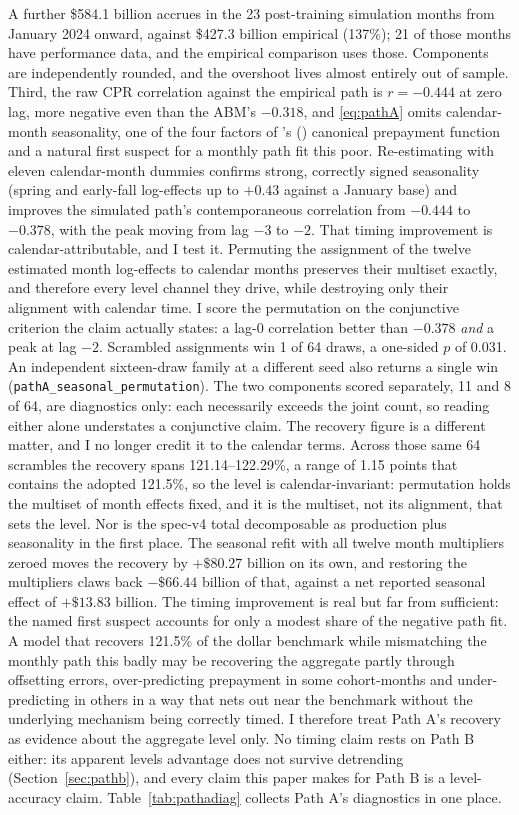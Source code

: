 \documentclass[12pt]{article}
\newcommand{\citepos}[1]{\citeauthor{#1}'s (\citeyear{#1})}
\begin{document}
A further \$584.1 billion accrues in the 23 post-training simulation months from January 2024 onward, against \$427.3 billion empirical (137\%); 21 of those months have performance data, and the empirical comparison uses those. Components are independently rounded, and the overshoot lives almost entirely out of sample. Third, the raw CPR correlation against the empirical path is $r = -0.444$ at zero lag, more negative even than the ABM's $-0.318$, and \eqref{eq:pathA} omits calendar-month seasonality, one of the four factors of \citepos{richard1989} canonical prepayment function and a natural first suspect for a monthly path fit this poor. Re-estimating with eleven calendar-month dummies confirms strong, correctly signed seasonality (spring and early-fall log-effects up to $+0.43$ against a January base) and improves the simulated path's contemporaneous correlation from $-0.444$ to $-0.378$, with the peak moving from lag $-3$ to $-2$. That timing improvement is calendar-attributable, and I test it. Permuting the assignment of the twelve estimated month log-effects to calendar months preserves their multiset exactly, and therefore every level channel they drive, while destroying only their alignment with calendar time. I score the permutation on the conjunctive criterion the claim actually states: a lag-0 correlation better than $-0.378$ \emph{and} a peak at lag $-2$. Scrambled assignments win 1 of 64 draws, a one-sided $p$ of 0.031. An independent sixteen-draw family at a different seed also returns a single win (\texttt{pathA\_seasonal\_permutation}). The two components scored separately, 11 and 8 of 64, are diagnostics only: each necessarily exceeds the joint count, so reading either alone understates a conjunctive claim. The recovery figure is a different matter, and I no longer credit it to the calendar terms. Across those same 64 scrambles the recovery spans 121.14--122.29\%, a range of 1.15 points that contains the adopted 121.5\%, so the level is calendar-invariant: permutation holds the multiset of month effects fixed, and it is the multiset, not its alignment, that sets the level. Nor is the spec-v4 total decomposable as production plus seasonality in the first place. The seasonal refit with all twelve month multipliers zeroed moves the recovery by $+\$80.27$ billion on its own, and restoring the multipliers claws back $-\$66.44$ billion of that, against a net reported seasonal effect of $+\$13.83$ billion. The timing improvement is real but far from sufficient: the named first suspect accounts for only a modest share of the negative path fit. A model that recovers 121.5\% of the dollar benchmark while mismatching the monthly path this badly may be recovering the aggregate partly through offsetting errors, over-predicting prepayment in some cohort-months and under-predicting in others in a way that nets out near the benchmark without the underlying mechanism being correctly timed. I therefore treat Path A's recovery as evidence about the aggregate level only. No timing claim rests on Path B either: its apparent levels advantage does not survive detrending (Section~\ref{sec:pathb}), and every claim this paper makes for Path B is a level-accuracy claim. Table~\ref{tab:pathadiag} collects Path A's diagnostics in one place.
\end{document}
